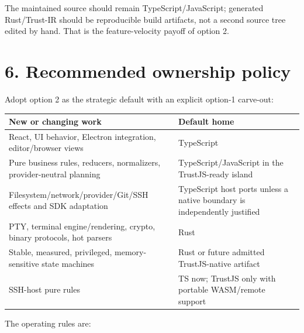 \documentclass[
  10pt,
  letterpaper,
]{article}
\newcounter{none} %
\begin{document}
The maintained source should remain TypeScript/JavaScript; generated
Rust/Trust-IR should be reproducible build artifacts, not a second
source tree edited by hand. That is the feature-velocity payoff of
option 2.

\section{6. Recommended ownership
policy}\label{6-recommended-ownership-policy}

Adopt option 2 as the strategic default with an explicit option-1
carve-out:

{\def\LTcaptype{none} %
\begin{longtable}[]{@{}
  >{\raggedright\arraybackslash}p{}
  >{\raggedright\arraybackslash}p{}@{}}
\toprule\noalign{}
\rowcolor{accent!12}
\begin{minipage}[b]{\linewidth}\raggedright
New or changing work
\end{minipage} & \begin{minipage}[b]{\linewidth}\raggedright
Default home
\end{minipage} \\
\midrule\noalign{}
\endhead
\bottomrule\noalign{}
\endlastfoot
React, UI behavior, Electron integration, editor/browser views &
TypeScript \\
Pure business rules, reducers, normalizers, provider-neutral planning &
TypeScript/JavaScript in the TrustJS-ready island \\
Filesystem/network/provider/Git/SSH effects and SDK adaptation &
TypeScript host ports unless a native boundary is independently
justified \\
PTY, terminal engine/rendering, crypto, binary protocols, hot parsers &
Rust \\
Stable, measured, privileged, memory-sensitive state machines & Rust or
future admitted TrustJS-native artifact \\
SSH-host pure rules & TS now; TrustJS only with portable WASM/remote
support \\
\end{longtable}
}

The operating rules are:
\end{document}
